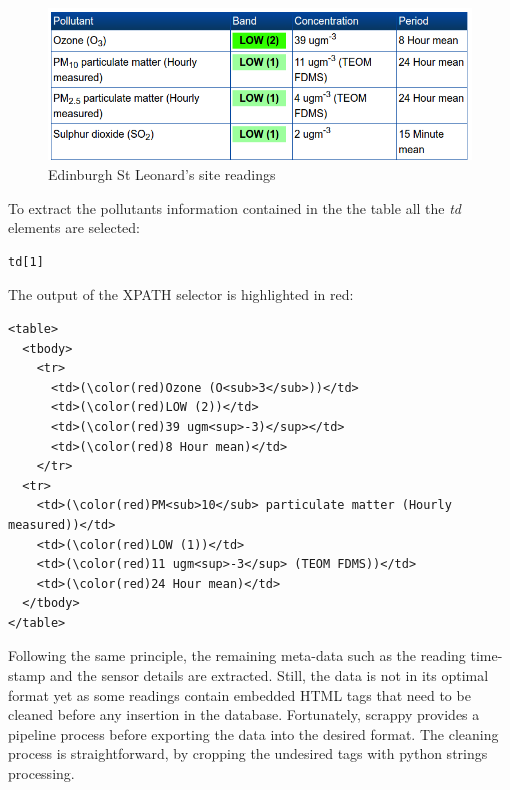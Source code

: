 \begin{figure}[H]
\begin{adjustbox}{width=.5\textwidth,center=\textwidth}
  \centering
  \includegraphics[scale=1]{images/site_readings.png}
\end{adjustbox}
  \caption[Edinburgh St Leonard's site readings]{Edinburgh St Leonard's site readings \footnotemark}
  \label{fig:pollution_site readings}
\end{figure}

To extract the pollutants information contained in the the table all the \textit{td} elements are selected: 

{\centering
\begin{BVerbatim}
td[1]
\end{BVerbatim}
\par
}\bigskip

The output of the XPATH selector is highlighted in red: 

\begin{Verbatim}[fontsize=\small,commandchars=\\\(\)]
<table>
  <tbody>
    <tr>
      <td>(\color(red)Ozone (O<sub>3</sub>))</td>
      <td>(\color(red)LOW (2))</td>
      <td>(\color(red)39 ugm<sup>-3)</sup></td>
      <td>(\color(red)8 Hour mean)</td>
    </tr>
  <tr>
    <td>(\color(red)PM<sub>10</sub> particulate matter (Hourly measured))</td>
    <td>(\color(red)LOW (1))</td>
    <td>(\color(red)11 ugm<sup>-3</sup> (TEOM FDMS))</td>
    <td>(\color(red)24 Hour mean)</td>
  </tbody>
</table>                
\end{Verbatim}

Following the same principle, the remaining meta-data such as the reading time-stamp and the sensor details are extracted. Still, the data is not in its optimal format yet as some readings contain embedded HTML tags that need to be cleaned before any insertion in the database. Fortunately, scrappy provides a pipeline process before exporting the data into the desired format. The cleaning process is straightforward, by cropping the undesired tags with python strings processing. 

